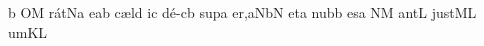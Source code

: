 \bigskip

\Internote
\nosolesmescustos
\initiumgregorianum
\znotes\fissum{1pt}\bmolle b\en
{}%
\sgn {}O{}\punctum M\egn
\sgn r{\'a}{t}\pes Na\egn
\sgn {}e{}\punctum a\augmentum b\egn
\spatium
\begingroup
\bgenerale
\sgn c{\ae}{l}\engl{}\punctum d\egn
\sgn {}i{}\punctum c\egn
\spatium
\sgn d{\'e}{-}\clivis cb\egn
\sgn su{p}\punctum a\egn
\sgn {}e{r,}\clivis aN\augmentumduplex bN\egn
\spatium
\divisiominor
\spatium
\sgn {}et\punctum a\egn
\spatium
\sgn n{u}b\punctum b\egn
\sgn {}es\punctum a\egn
\spatium
{}\clivis NM\egn
\sgn {}a{nt}\punctum L\egn
\spatium
\sgn j{u}{st}\clivis ML\egn
\sgn {}um\punctum K\augmentum L\egn
\spatium
\endgroup
\Finisgregoriana

\bigskip

